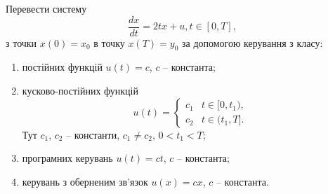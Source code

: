 \begin{problem}
    Перевести систему 
    \[ \dfrac{dx}{dt} = 2tx + u, t \in [0, T], \]
    з точки $x(0) = x_0$ в точку $x(T) = y_0$ за допомогою керування з класу:
    \begin{enumerate}
        \item постійних функцій $u(t) = c$, $c$ -- константа; 
        \item кусково-постійних функцій 
        \[
        u(t) = \begin{cases}
            c_1 & t \in [0, t_1), \\
            c_2 & t \in (t_1, T].
        \end{cases}
        \]
        Тут $c_1$, $c_2$ -- константи, $c_1 \ne c_2$, $0 < t_1 < T$;
        \item програмних керувань $u(t) = ct$, $c$ -- константа;
        \item керувань з оберненим зв'язок $u(x) = cx$, $c$ -- константа.
    \end{enumerate}
\end{problem}

